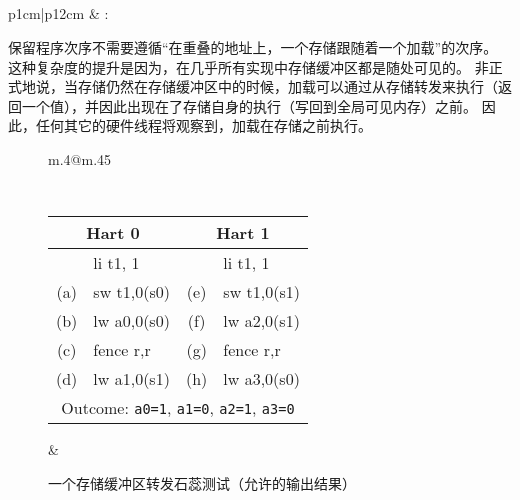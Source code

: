 \subsection{}
\label{sec:memory:loadvalueaxiom}
\begin{tabular}{p{1cm}|p{12cm}} &
: \loadvalueaxiom
\end{tabular}

保留程序次序不需要遵循“在重叠的地址上，一个存储跟随着一个加载”的次序。
这种复杂度的提升是因为，在几乎所有实现中存储缓冲区都是随处可见的。
非正式地说，当存储仍然在存储缓冲区中的时候，加载可以通过从存储转发来执行（返回一个值），并因此出现在了存储自身的执行（写回到全局可见内存）之前。
因此，任何其它的硬件线程将观察到，加载在存储之前执行。

\begin{figure}[h!]
  \centering
  \begin{tabular}{m{.4\linewidth}@{\qquad}m{.45\linewidth}}
  {
    \tt\small
    \begin{tabular}{cl||cl}
    \multicolumn{2}{c}{Hart 0} & \multicolumn{2}{c}{Hart 1} \\
    \hline
          & li t1, 1    &     & li t1, 1    \\
      (a) & sw t1,0(s0) & (e) & sw t1,0(s1) \\
      (b) & lw a0,0(s0) & (f) & lw a2,0(s1) \\
      (c) & fence r,r   & (g) & fence r,r   \\
      (d) & lw a1,0(s1) & (h) & lw a3,0(s0) \\
      \hline
      \multicolumn{4}{c}{Outcome: {\tt a0=1}, {\tt a1=0}, {\tt a2=1}, {\tt a3=0}}
    \end{tabular}
  }
  &
  
  \end{tabular}
  \caption{一个存储缓冲区转发石蕊测试（允许的输出结果）
    }
  \label{fig:litmus:storebuffer}
\end{figure}

